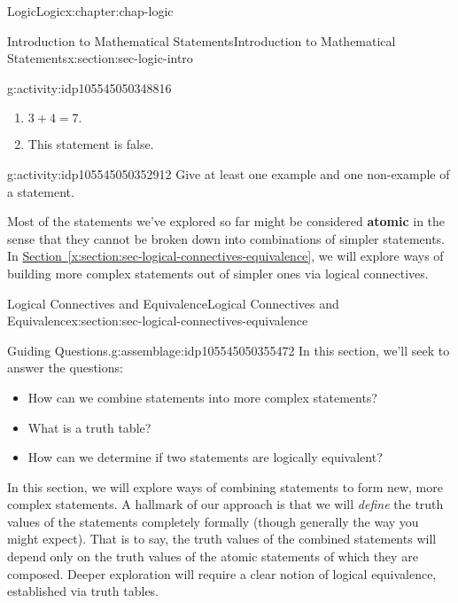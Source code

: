 \documentclass[oneside,10pt,]{book}
\newcommand{\xreffont}{\relax}
\newcommand{\terminology}[1]{\textbf{#1}}
\begin{document}
\begin{chapterptx}{Logic}{}{Logic}{}{}{x:chapter:chap-logic}
\begin{sectionptx}{Introduction to Mathematical Statements}{}{Introduction to Mathematical Statements}{}{}{x:section:sec-logic-intro}
\begin{activity}{}{g:activity:idp105545050348816}
\begin{enumerate}
\item{}\(\displaystyle 3+4=7.\)%
\item{}This statement is false.%
\end{enumerate}
\end{activity}%
\begin{activity}{}{g:activity:idp105545050352912}%
Give at least one example and one non-example of a statement.%
\end{activity}%
Most of the statements we've explored so far might be considered \terminology{atomic} in the sense that they cannot be broken down into combinations of simpler statements. In \hyperref[x:section:sec-logical-connectives-equivalence]{Section~{\xreffont\ref{x:section:sec-logical-connectives-equivalence}}}, we will explore ways of building more complex statements out of simpler ones via logical connectives.%
\end{sectionptx}
%
%
\typeout{************************************************}
\typeout{************************************************}
%
\begin{sectionptx}{Logical Connectives and Equivalence}{}{Logical Connectives and Equivalence}{}{}{x:section:sec-logical-connectives-equivalence}
\begin{assemblage}{Guiding Questions.}{g:assemblage:idp105545050355472}%
In this section, we'll seek to answer the questions: %
\begin{itemize}[label=\textbullet]
\item{}How can we combine statements into more complex statements?%
\item{}What is a truth table?%
\item{}How can we determine if two statements are logically equivalent?%
\end{itemize}
%
\end{assemblage}
\begin{introduction}{}%
In this section, we will explore ways of combining statements to form new, more complex statements. A hallmark of our approach is that we will \emph{define} the truth values of the statements completely formally (though generally the way you might expect). That is to say, the truth values of the combined statements will depend only on the truth values of the atomic statements of which they are composed. Deeper exploration will require a clear notion of logical equivalence, established via truth tables.%
\end{introduction}%
%
%
\typeout{************************************************}

\end{sectionptx}
\end{chapterptx}
\end{document}
